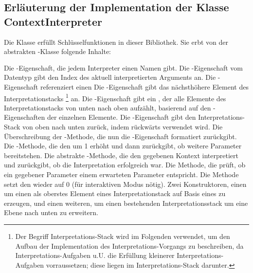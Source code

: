 \subsection{Erläuterung der Implementation der Klasse ContextInterpreter}\label{subsec:ContextInterpreter}
Die Klasse  erfüllt Schlüsselfunktionen in dieser Bibliothek.
Sie erbt von der abstrakten -Klasse folgende Inhalte:
\begin{outline}
 \1 Die -Eigenschaft, die jedem Interpreter einen Namen gibt.
 \1 Die -Eigenschaft vom Datentyp  gibt den Index des aktuell interpretierten Arguments an.
 \1 Die -Eigenschaft referenziert einen 
 \1 Die -Eigenschaft gibt das nächsthöhere Element des Interpretationstacks
 \footnote{Der Begriff Interpretations-Stack wird im Folgenden verwendet, um den Aufbau der Implementation des Interpretations-Vorgangs zu beschreiben, da Interpretations-Aufgaben u.U. die Erfüllung kleinerer Interpretations-Aufgaben vorraussetzen; diese liegen im Interpretations-Stack darunter.}
 an.%
 \1 Die -Eigenschaft gibt ein , der alle Elemente des Interpretationstacks von unten nach oben aufzählt,
 basierend auf den -Eigenschaften der einzelnen Elemente.
 \1 Die -Eigenschaft gibt den Interpretations-Stack von oben nach unten zurück, indem  rückwärts verwendet wird.
 \1 Die Überschreibung der -Methode, die nun die -Eigenschaft formatiert zurückgibt.
 \1 Die -Methode, die den  um 1 erhöht und dann zurückgibt, ob weitere Parameter bereitstehen.
 \1 Die abstrakte -Methode, die den gegebenen Kontext interpretiert und zurückgibt, ob die Interpretation erfolgreich war.
 \1 Die  Methode, die prüft, ob ein gegebener Parameter einem erwarteten Parameter entspricht.
 \1 Die  Methode setzt den  wieder auf 0 (für interaktiven Modus nötig).
 \1 Zwei Konstruktoren, einen um einen  als oberstes Element eines Interpretationstack auf Basis eines  zu erzeugen, und einen weiteren, um einen bestehenden Interpretationsstack um eine Ebene nach unten zu erweitern.
\end{outline}
